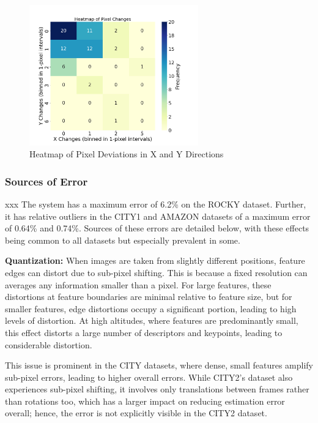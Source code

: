\begin{figure}[H]
    \centering
    \includegraphics[width=0.65\textwidth]{Chapter 5/RESULTPLOTS/XYHEAT.png}
    \caption{Heatmap of Pixel Deviations in X and Y Directions}
    \label{fig:Heatmap_XY_Dev}
\end{figure}



\subsubsection{Sources of Error}
xxx
The system has a maximum error of 6.2\% on the ROCKY dataset. Further, it has relative outliers in the CITY1 and AMAZON datasets of a maximum error of 0.64\% and 0.74\%. Sources of these errors are detailed below, with these effects being common to all datasets but especially prevalent in some. 


\textbf{Quantization:} 
When images are taken from slightly different positions, feature edges can distort due to sub-pixel shifting. This is because a fixed resolution can averages any information smaller than a pixel. For large features, these distortions at feature boundaries are minimal relative to feature size, but for smaller features, edge distortions occupy a significant portion, leading to high levels of distortion. At high altitudes, where features are predominantly small, this effect distorts a large number of descriptors and keypoints, leading to considerable distortion.

This issue is prominent in the CITY datasets, where dense, small features amplify sub-pixel errors, leading to higher overall errors. While CITY2’s dataset also experiences sub-pixel shifting, it involves only translations between frames rather than rotations too, which has a larger impact on reducing estimation error overall; hence, the error is not explicitly visible in the CITY2 dataset.

